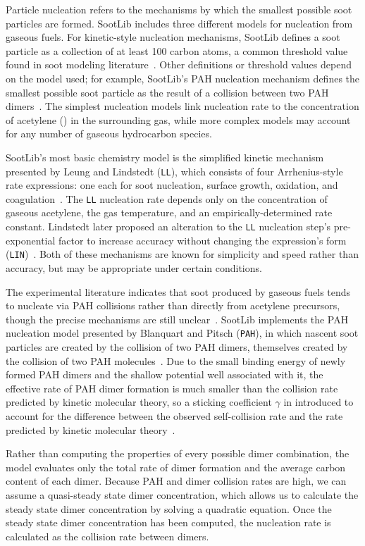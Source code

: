\documentclass[preprint,letterpaper]{elsarticle}
\begin{document}
Particle nucleation refers to the mechanisms by which the smallest possible soot particles are formed. SootLib includes three different models for nucleation from gaseous fuels. For kinetic-style nucleation mechanisms, SootLib defines a soot particle as a collection of at least 100 carbon atoms, a common threshold value found in soot modeling literature~\cite{Leung_1991}. Other definitions or threshold values depend on the model used; for example, SootLib's PAH nucleation mechanism defines the smallest possible soot particle as the result of a collision between two PAH dimers~\cite{Blanquart_2009c}. The simplest nucleation models link nucleation rate to the concentration of acetylene () in the surrounding gas, while more complex models may account for any number of gaseous hydrocarbon species.

SootLib's most basic chemistry model is the simplified kinetic mechanism presented by Leung and Lindstedt (\texttt{LL}), which consists of four Arrhenius-style rate expressions: one each for soot nucleation, surface growth, oxidation, and coagulation~\cite{Leung_1991}. The \texttt{LL} nucleation rate depends only on the concentration of gaseous acetylene, the gas temperature, and an empirically-determined rate constant. Lindstedt later proposed an alteration to the \texttt{LL} nucleation step's pre-exponential factor to increase accuracy without changing the expression's form (\texttt{LIN})~\cite{Lindstedt_2005}. Both of these mechanisms are known for simplicity and speed rather than accuracy, but may be appropriate under certain conditions.

The experimental literature indicates that soot produced by gaseous fuels tends to nucleate via PAH collisions rather than directly from acetylene precursors, though the precise mechanisms are still unclear~\cite{Wang_2011}. SootLib implements the PAH nucleation model presented by Blanquart and Pitsch (\texttt{PAH}), in which nascent soot particles are created by the collision of two PAH dimers, themselves created by the collision of two PAH molecules~\cite{Blanquart_2009c}. Due to the small binding energy of newly formed PAH dimers and the shallow potential well associated with it, the effective rate of PAH dimer formation is much smaller than the collision rate predicted by kinetic molecular theory, so a sticking coefficient $\gamma$ in introduced to account for the difference between the observed self-collision rate and the rate predicted by kinetic molecular theory~\cite{Blanquart_2009c}.

Rather than computing the properties of every possible dimer combination, the model evaluates only the total rate of dimer formation and the average carbon content of each dimer. Because PAH and dimer collision rates are high, we can assume a quasi-steady state dimer concentration, which allows us to calculate the steady state dimer concentration by solving a quadratic equation. Once the steady state dimer concentration has been computed, the nucleation rate is calculated as the collision rate between dimers.
\end{document}
